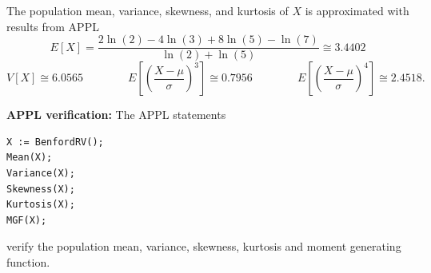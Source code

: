\documentclass[12pt,fullpage]{article}
\begin{document}

\noindent The population mean, variance, skewness, and kurtosis  of $X$ is approximated with results from APPL
$$
E[X] = \frac{2\ln(2)-4\ln(3)+8\ln(5)-\ln(7)}{\ln(2)+\ln(5)}\cong 3.4402
$$
$$
V[X] \cong 6.0565 \qquad \qquad 
E\left[ \left( \frac{X - \mu}{\sigma} \right) ^ 3 \right] \cong 0.7956 \qquad \qquad 
E\left[ \left( \frac{X - \mu}{\sigma} \right) ^ 4 \right] \cong 2.4518.
$$

\vspace{0.1in}

\noindent
{\bf APPL verification:}
The APPL statements
\begin{verbatim}
X := BenfordRV();
Mean(X);
Variance(X);
Skewness(X);
Kurtosis(X);
MGF(X);
\end{verbatim}
verify the population mean, variance, skewness, kurtosis and moment generating function.
\end{document}
